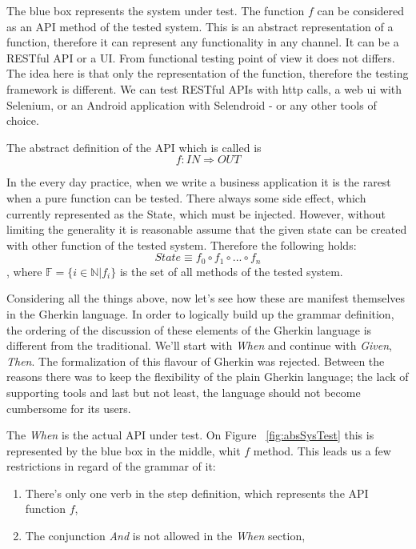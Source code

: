 \documentclass[conference]{IEEEtran}
\begin{document}
The blue box represents the system under test. The function \(f\) can be considered as an API method of the tested system. This is an abstract representation of a function, therefore it can represent any functionality in any channel. It can be a RESTful API or a UI. From functional testing point of view it does not differs. The idea here is that only the representation of the function, therefore the testing framework is different. We can test RESTful APIs with http calls, a web ui with Selenium, or an Android application with Selendroid - or any other tools of choice. 

The abstract definition of the API which is called is 
\begin{equation} \label{eq:apiFn}
    f: IN \Rightarrow OUT
\end{equation}

In the every day practice, when we write a business application it is the rarest when a pure function can be tested. There always some side effect, which currently represented as the State, which must be injected. However, without limiting the generality it is reasonable assume that the given state can be created with other function of the tested system. Therefore the following holds:
\begin{equation} \label{eq:stateAsComposition}
    State \equiv f_{0} \circ f_{1} \circ ... \circ f_{n}
\end{equation}
, where \( \mathbb{F} = \{ i \in \mathbb{N} | f_{i} \} \) is the set of all methods of the tested system.

Considering all the things above, now let's see how these are manifest themselves in the Gherkin language. In order to logically build up the grammar definition, the ordering of the discussion of these elements of the Gherkin language is different from the traditional. We'll start with \textit{When} and continue with \textit{Given}, \textit{Then}. The formalization of this flavour of Gherkin was rejected. Between the reasons there was to keep the flexibility of the plain Gherkin language; the lack of supporting tools and last but not least, the language should not become cumbersome for its users.

The \textit{When} is the actual API under test. On Figure ~\ref{fig:absSysTest} this is represented by the blue box in the middle, whit \(f\) method. This leads us a few restrictions in regard of the grammar of it:
\begin{enumerate}[label=w.\arabic*]
    \item There's only one verb in the step definition, which represents the API function \(f\),
    \item The conjunction \textit{And} is not allowed in the \textit{When} section,
\end{enumerate}
\end{document}

